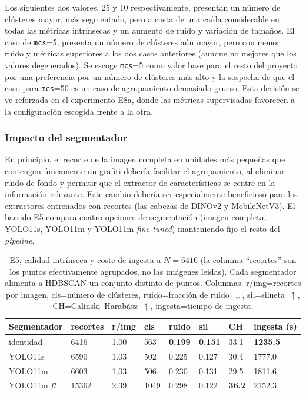 Los siguientes dos valores, 25 y 10 respectivamente, presentan un número de
clústeres mayor, más segmentado, pero a costa de una caída considerable en
todas las métricas intrínsecas y un aumento de ruido y variación de tamaños. El
caso de \texttt{mcs}=5, presenta un número de clústeres aún mayor, pero con
menor ruido y métricas superiores a los dos casos anteriores (aunque no mejores
que los valores degenerados). Se escoge \texttt{mcs}=5 como valor base para el
resto del proyecto por una preferencia por un número de clústeres más alto y la
sospecha de que el caso para \texttt{mcs}=50 es un caso de agrupamiento
demasiado grueso. Esta decisión se ve reforzada en el experimento E8a, donde
las métricas supervisadas favorecen a la configuración escogida frente a la
otra.

\subsubsection{Impacto del segmentador}
\label{subsubsec:res-segmentador}
En principio, el recorte de la imagen completa en unidades más pequeñas que
contengan únicamente un grafiti debería facilitar el agrupamiento, al eliminar
ruido de fondo y permitir que el extractor de características se centre en la
información relevante. Este cambio debería ser especialmente beneficioso para
los extractores entrenados con recortes (las cabezas de DINOv2 y MobileNetV3).
El barrido E5 compara cuatro opciones de segmentación (imagen completa,
YOLO11s, YOLO11m y YOLO11m \textit{fine-tuned}) manteniendo fijo el resto del
\textit{pipeline}.

\begin{table}[h]
  \centering
{\footnotesize
\begin{tabular}{|p{2.5cm}|p{1.5cm}|p{1.0cm}|p{1.0cm}|p{1.1cm}|p{1.0cm}|p{1.0cm}|p{1.4cm}|} \hline
  \textbf{Segmentador} & \textbf{recortes} & \textbf{r/img} & \textbf{cls} & \textbf{ruido} & \textbf{sil} & \textbf{CH} & \textbf{ingesta (s)} \\ \hline
  identidad           & 6416  & 1.00 &  563 & \textbf{0.199} & \textbf{0.151} & 33.1 & \textbf{1235.5} \\ \hline
  YOLO11s             & 6590  & 1.03 &  502 & 0.225 & 0.127 & 30.4 & 1777.0 \\ \hline
  YOLO11m             & 6603  & 1.03 &  506 & 0.230 & 0.131 & 29.5 & 1811.6 \\ \hline
  YOLO11m \textit{ft} & 15362 & 2.39 & 1049 & 0.298 & 0.122 & \textbf{36.2} & 2152.3 \\ \hline
\end{tabular}
}
  \caption[E5, calidad y coste de ingesta a $N=6416$]{E5, calidad intrínseca y coste de ingesta a $N=6416$ (la columna
  \enquote{recortes} son los puntos efectivamente agrupados, no las imágenes leídas).
  Cada segmentador alimenta a HDBSCAN un conjunto distinto de puntos.
  Columnas: r/img=recortes por imagen, cls=número de clústeres,
  ruido=fracción de ruido~$\downarrow$, sil=silueta~$\uparrow$,
  CH=Calinski--Harabász~$\uparrow$, ingesta=tiempo de ingesta.}
  \label{tab:e5-segmenter-6416}
\end{table}

